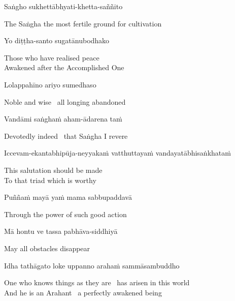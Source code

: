 Saṅgho sukhettābhyati-khetta-saññito

\begin{english}
  The Saṅgha the most fertile ground for cultivation
\end{english}

Yo diṭṭha-santo sugatānubodhako

\begin{english}
  Those who have realised peace\\
  Awakened after the Accomplished One
\end{english}

Lolappahīno ariyo sumedhaso

\begin{english}
  Noble and wise \breathmark\ all longing abandoned
\end{english}

Vandāmi saṅghaṁ aham-ādarena taṁ

\begin{english}
  Devotedly indeed \breathmark\ that Saṅgha I revere
\end{english}

Iccevam-ekantabhipūja-neyyakaṁ vatthuttayaṁ vandayatābhisaṅkhataṁ

\begin{english}
  This salutation should be made\\
  To that triad
  which is worthy
\end{english}

Puññaṁ mayā yaṁ mama sabbupaddavā

\begin{english}
  Through the power of such good action
\end{english}

Mā hontu ve tassa pabhāva-siddhiyā

\begin{english}
  May all obstacles disappear
\end{english}

Idha tathāgato loke uppanno arahaṁ sammāsambuddho

\begin{english}
  One who knows things as they are \breathmark\ has arisen in this world\\
  And he is an Arahant \breathmark\ a perfectly awakened being
\end{english}

